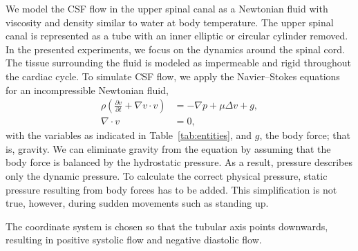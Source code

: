 We model the CSF flow in the upper spinal canal as a Newtonian fluid
 with viscosity and density similar to water
at body temperature. The upper spinal canal is represented as a tube
with an inner elliptic or circular cylinder removed.  In the presented
experiments, we focus on the dynamics around the spinal cord. The
tissue surrounding the fluid is modeled as impermeable and rigid
throughout the cardiac cycle. To simulate CSF flow, we apply the
Navier--Stokes  equations for an incompressible
Newtonian fluid,
\begin{equation}
  \begin{split}
    \rho \left(\frac{\partial v}{\partial t} + \nabla v \cdot v \right) &= -\nabla p + \mu \Delta v + g, \\
    \nabla \cdot v &= 0,
  \end{split}
\end{equation}
with the variables as indicated in Table~\ref{tab:entities}, and $g$,
the body force; that is, gravity. We can eliminate gravity from the
equation by assuming that the body force is balanced by the
hydrostatic pressure. As a result, pressure describes only the dynamic
pressure. To calculate the correct physical pressure, static pressure
resulting from body forces has to be added. This simplification is not
true, however, during sudden movements such as standing up.

The coordinate system is chosen so that the tubular axis points downwards, resulting in positive systolic flow and negative diastolic flow.

